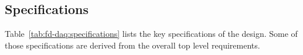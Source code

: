  
\subsection{Specifications}
\label{sec:fd-daq:specifications}

Table~\ref{tab:fd-daq:specifications} lists
the key specifications of the  design.  Some of those
specifications are derived from the overall   
top level requirements.




%

